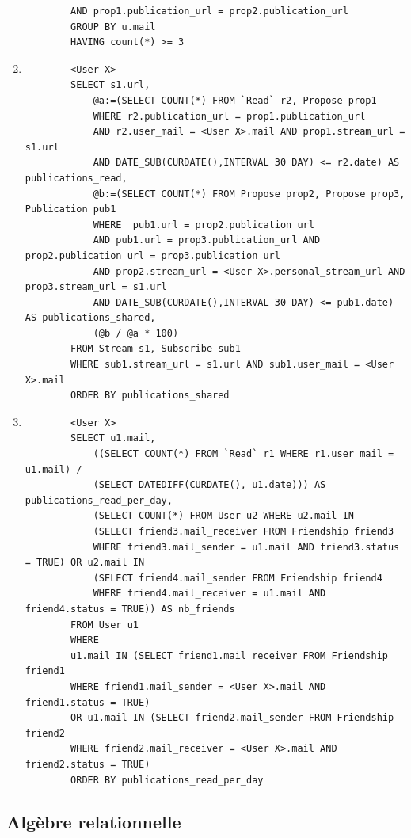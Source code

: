 \documentclass[a4paper,10pt]{article}
\begin{document}
\begin{enumerate}
\begin{verbatim}
		AND prop1.publication_url = prop2.publication_url
		GROUP BY u.mail
		HAVING count(*) >= 3
             \end{verbatim}
	    \item 
	    \begin{verbatim}
		<User X>
		SELECT s1.url, 
		    @a:=(SELECT COUNT(*) FROM `Read` r2, Propose prop1 
		    WHERE r2.publication_url = prop1.publication_url 
		    AND r2.user_mail = <User X>.mail AND prop1.stream_url = s1.url 
		    AND DATE_SUB(CURDATE(),INTERVAL 30 DAY) <= r2.date) AS publications_read,
		    @b:=(SELECT COUNT(*) FROM Propose prop2, Propose prop3, Publication pub1 
		    WHERE  pub1.url = prop2.publication_url 
		    AND pub1.url = prop3.publication_url AND prop2.publication_url = prop3.publication_url 
		    AND prop2.stream_url = <User X>.personal_stream_url AND prop3.stream_url = s1.url 
		    AND DATE_SUB(CURDATE(),INTERVAL 30 DAY) <= pub1.date) AS publications_shared,
		    (@b / @a * 100)
		FROM Stream s1, Subscribe sub1
		WHERE sub1.stream_url = s1.url AND sub1.user_mail = <User X>.mail
		ORDER BY publications_shared
             \end{verbatim}
	    \item 
	    \begin{verbatim}
		<User X>
		SELECT u1.mail,
		    ((SELECT COUNT(*) FROM `Read` r1 WHERE r1.user_mail = u1.mail) / 
		    (SELECT DATEDIFF(CURDATE(), u1.date))) AS publications_read_per_day,
		    (SELECT COUNT(*) FROM User u2 WHERE u2.mail IN 
		    (SELECT friend3.mail_receiver FROM Friendship friend3 
		    WHERE friend3.mail_sender = u1.mail AND friend3.status = TRUE) OR u2.mail IN 
		    (SELECT friend4.mail_sender FROM Friendship friend4 
		    WHERE friend4.mail_receiver = u1.mail AND friend4.status = TRUE)) AS nb_friends
		FROM User u1
		WHERE 
		u1.mail IN (SELECT friend1.mail_receiver FROM Friendship friend1 
		WHERE friend1.mail_sender = <User X>.mail AND friend1.status = TRUE)
		OR u1.mail IN (SELECT friend2.mail_sender FROM Friendship friend2 
		WHERE friend2.mail_receiver = <User X>.mail AND friend2.status = TRUE)
		ORDER BY publications_read_per_day
             \end{verbatim}
	\end{enumerate}

\subsection{Algèbre relationnelle}

\end{document}
